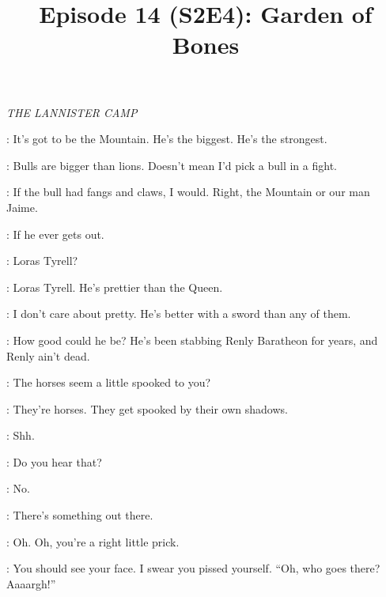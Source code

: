 

\title{Episode 14 (S2E4):  Garden of Bones}
\author{}
\date{}
\maketitle




\scene

\textit{THE LANNISTER CAMP} 


\LANNISTERGUARD: It's got to be the Mountain. He's the biggest. He's the strongest. 

\RENNICK: Bulls are bigger than lions. Doesn't mean I'd pick a bull in a fight. 

\LANNISTERGUARD: If the bull had fangs and claws, I would. Right, the Mountain or our man Jaime. 

\RENNICK: If he ever gets out. 

\LANNISTERGUARD: Loras Tyrell? 

\RENNICK: Loras Tyrell. He's prettier than the Queen. 

\LANNISTERGUARD: I don't care about pretty. He's better with a sword than any of them. 

\RENNICK: How good could he be? He's been stabbing Renly Baratheon for years, and Renly ain't dead. 


\RENNICK: The horses seem a little spooked to you? 

\LANNISTERGUARD: They're horses. They get spooked by their own shadows. 

\RENNICK: Shh. 


\RENNICK: Do you hear that? 

\LANNISTERGUARD: No. 

\RENNICK: There's something out there. 



\LANNISTERGUARD: Oh. Oh, you're a right little prick. 

\RENNICK: You should see your face. I swear you pissed yourself. ``Oh, who goes there? Aaaargh!'' 

